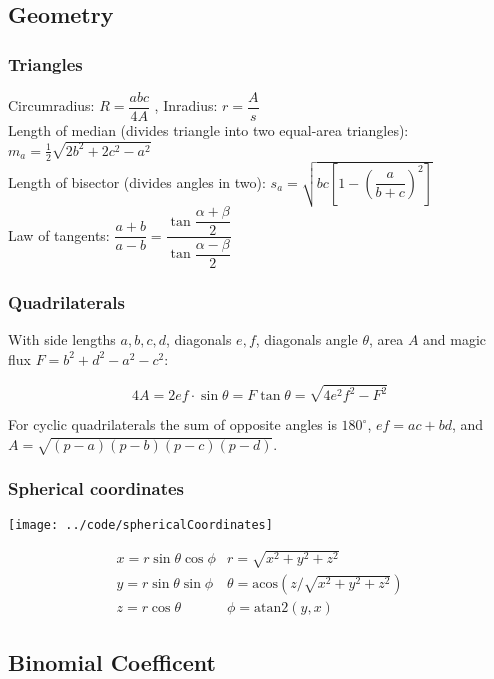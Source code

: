 \subsection{Geometry}
\subsubsection{Triangles}
Circumradius: $R=\dfrac{abc}{4A}$ , Inradius: $r=\dfrac{A}{s}$\\
Length of median (divides triangle into two equal-area triangles): $m_a=\tfrac{1}{2}\sqrt{2b^2+2c^2-a^2}$\\
Length of bisector (divides angles in two): $s_a=\sqrt{bc\left[1-\left(\dfrac{a}{b+c}\right)^2\right]}$\\
Law of tangents: $\dfrac{a+b}{a-b}=\dfrac{\tan\dfrac{\alpha+\beta}{2}}{\tan\dfrac{\alpha-\beta}{2}}$\\
\subsubsection{Quadrilaterals}
With side lengths $a,b,c,d$, diagonals $e, f$, diagonals angle $\theta$, area $A$ and
magic flux $F=b^2+d^2-a^2-c^2$:

\[ 4A = 2ef \cdot \sin\theta = F\tan\theta = \sqrt{4e^2f^2-F^2} \]

 For cyclic quadrilaterals the sum of opposite angles is $180^\circ$,
$ef = ac + bd$, and $A = \sqrt{(p-a)(p-b)(p-c)(p-d)}$.

\subsubsection{Spherical coordinates}
\centerline{\texttt{[image: ../code/sphericalCoordinates]}}
\[\begin{array}{cc}
x = r\sin\theta\cos\phi & r = \sqrt{x^2+y^2+z^2}\\
y = r\sin\theta\sin\phi & \theta = \textrm{acos}(z/\sqrt{x^2+y^2+z^2})\\
z = r\cos\theta & \phi = \textrm{atan2}(y,x)
\end{array}\]

\subsection{Binomial Coefficent}

